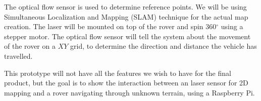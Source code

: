 The optical flow sensor is used to determine reference points. We will be using Simultaneous Localization and Mapping (SLAM) technique for the actual map creation. The laser will be mounted on top of the rover and spin 360$^{\circ}$ using a stepper motor. The optical flow sensor will tell the system about the movement of the rover on a $XY$ grid, to determine the direction and distance the vehicle has travelled. 

This prototype will not have all the features we wish to have for the final product, but the goal is to show the interaction between an laser sensor for 2D mapping and a rover navigating through unknown terrain, using a Raspberry Pi.

